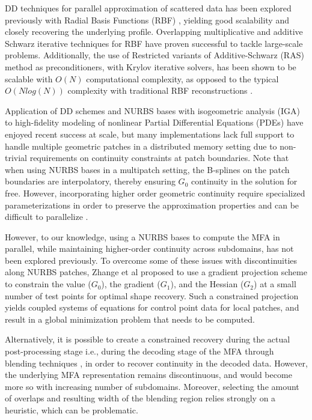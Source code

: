 \documentclass[conference]{IEEEtran}
\begin{document}
DD techniques for parallel approximation of scattered data has been explored previously with Radial Basis Functions (RBF) \cite{mai-approx-rbf}, yielding good scalability and closely recovering the underlying profile. Overlapping multiplicative and additive Schwarz \cite{orasm-as-ms-2007} iterative techniques for RBF \cite{ddm-rbf} have proven successful to tackle large-scale problems. Additionally, the use of Restricted variants of Additive-Schwarz (RAS) method as preconditioners, with Krylov iterative solvers, has been shown to be scalable \cite{yokota-rasm-rbf} with $O(N)$ computational complexity, as opposed to the typical $O(N log(N))$ complexity with traditional RBF reconstructions \cite{ddm-rbf-fast}. 

Application of DD schemes and NURBS bases with isogeometric analysis (IGA) to high-fidelity modeling of nonlinear Partial Differential Equations (PDEs) have enjoyed recent success \cite{marini2015parallel, petiga-dalcin-2016} at scale, but many implementations lack full support to handle multiple geometric patches in a distributed memory setting due to non-trivial requirements on continuity constraints at patch boundaries. Note that when using NURBS bases in a multipatch setting, the B-splines on the patch boundaries are interpolatory, thereby ensuring $G_0$ continuity in the solution for free. However, incorporating higher order geometric continuity require specialized parameterizations in order to preserve the approximation properties \cite{kapl2018construction} and can be difficult to parallelize \cite{hofer2018fast}. 

However, to our knowledge, using a NURBS bases to compute the MFA in parallel, while maintaining higher-order continuity across subdomains, has not been explored previously. 
To overcome some of these issues with discontinuities along NURBS patches, Zhange et al \cite{zhang-nurbs-continuity} proposed to use a gradient projection scheme to constrain the value ($G_0$), the gradient ($G_1$), and the Hessian ($G_2$) at a small number of test points for optimal shape recovery. Such a constrained projection yields coupled systems of equations for control point data for local patches, and result in a global minimization problem that needs to be computed.

Alternatively, it is possible to create a constrained recovery during the actual post-processing stage i.e., during the decoding stage of the MFA through blending techniques \cite{grindeanu-blending}, in order to recover continuity in the decoded data. However, the underlying MFA representation remains discontinuous, and would become more so with increasing number of subdomains. Moreover, selecting the amount of overlaps and resulting width of the blending region relies strongly on a heuristic, which can be problematic.
\end{document}
